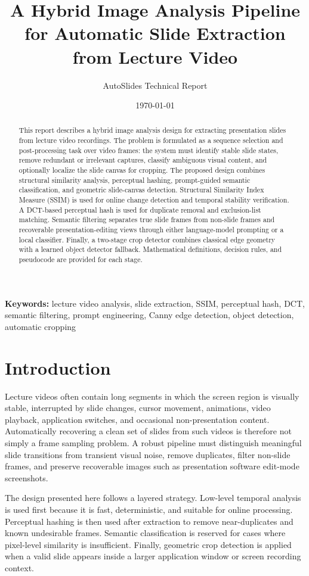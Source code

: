 \documentclass[11pt]{article}
\title{A Hybrid Image Analysis Pipeline for Automatic Slide Extraction from Lecture Video}
\author{AutoSlides Technical Report}
\date{\today}
\begin{document}
\maketitle

\begin{abstract}
This report describes a hybrid image analysis design for extracting presentation slides from lecture video recordings. The problem is formulated as a sequence selection and post-processing task over video frames: the system must identify stable slide states, remove redundant or irrelevant captures, classify ambiguous visual content, and optionally localize the slide canvas for cropping. The proposed design combines structural similarity analysis, perceptual hashing, prompt-guided semantic classification, and geometric slide-canvas detection. Structural Similarity Index Measure (SSIM) is used for online change detection and temporal stability verification. A DCT-based perceptual hash is used for duplicate removal and exclusion-list matching. Semantic filtering separates true slide frames from non-slide frames and recoverable presentation-editing views through either language-model prompting or a local classifier. Finally, a two-stage crop detector combines classical edge geometry with a learned object detector fallback. Mathematical definitions, decision rules, and pseudocode are provided for each stage.
\end{abstract}

\noindent\textbf{Keywords:} lecture video analysis, slide extraction, SSIM, perceptual hash, DCT, semantic filtering, prompt engineering, Canny edge detection, object detection, automatic cropping

\section{Introduction}

Lecture videos often contain long segments in which the screen region is visually stable, interrupted by slide changes, cursor movement, animations, video playback, application switches, and occasional non-presentation content. Automatically recovering a clean set of slides from such videos is therefore not simply a frame sampling problem. A robust pipeline must distinguish meaningful slide transitions from transient visual noise, remove duplicates, filter non-slide frames, and preserve recoverable images such as presentation software edit-mode screenshots.

The design presented here follows a layered strategy. Low-level temporal analysis is used first because it is fast, deterministic, and suitable for online processing. Perceptual hashing is then used after extraction to remove near-duplicates and known undesirable frames. Semantic classification is reserved for cases where pixel-level similarity is insufficient. Finally, geometric crop detection is applied when a valid slide appears inside a larger application window or screen recording context.
\end{document}
